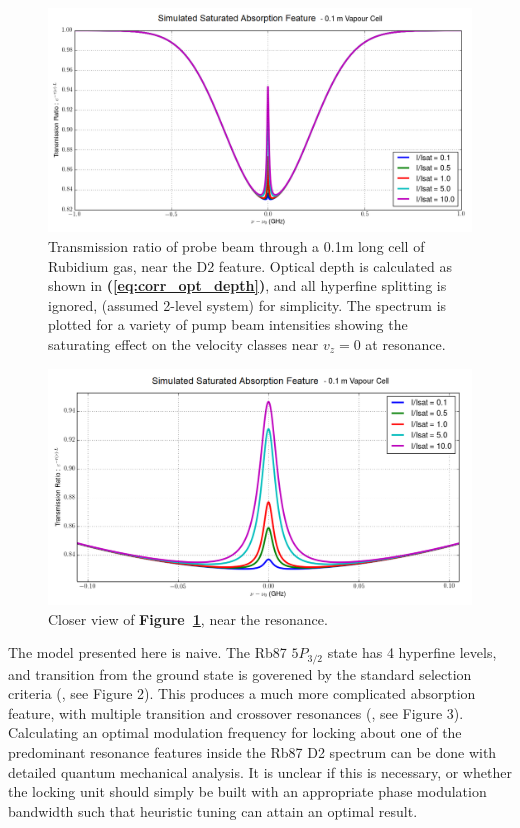 \begin{figure}
  \centering
  \includegraphics[scale=0.5]{rb_D2_single_absorption.png}
  \caption{Transmission ratio of probe beam through a 0.1m long cell of Rubidium
  gas, near the D2 feature. Optical depth is calculated as shown in
  \textbf{(\ref{eq:corr_opt_depth})},
  and all hyperfine splitting is ignored, (assumed 2-level system) for
  simplicity. The spectrum is plotted for a variety of pump beam intensities
  showing the saturating effect on the velocity classes near $v_z = 0$ at
  resonance.}
  \label{fig:rb87d2abs}
\end{figure}

\begin{figure}
  \centering
  \includegraphics[scale=0.5]{rb_D2_single_absorption_resonance.png}
  \caption{Closer view of \textbf{Figure~\ref{fig:rb87d2abs}}, near the
  resonance.}
  \label{fig:rb87d2abs_closer}
\end{figure}

The model presented here is naive. The Rb87 $5P_{3/2}$ state has 4 hyperfine
levels, and transition from the ground state is goverened by the standard
selection criteria (\cite{steckrb87}, see Figure 2). This produces a much more
complicated absorption feature, with multiple transition and crossover
resonances (\cite{maguire2006}, see Figure 3). Calculating an optimal modulation
frequency for locking about one of the predominant resonance features inside the
Rb87 D2 spectrum can be done with detailed quantum mechanical analysis. It is
unclear if this is necessary, or whether the locking unit should simply be built
with an appropriate phase modulation bandwidth such that heuristic tuning can
attain an optimal result.

